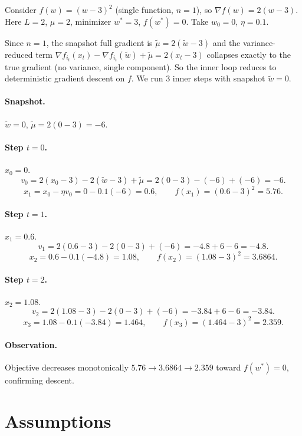 \documentclass{article}
\begin{document}
Consider $f(w) = (w-3)^2$ (single function, $n=1$), so $\nabla f(w) = 2(w-3)$. Here $L=2$, $\mu=2$, minimizer $w^*=3$, $f(w^*)=0$. Take $w_0 = 0$, $\eta = 0.1$.

Since $n=1$, the snapshot full gradient is $\tilde{\mu} = 2(\tilde{w}-3)$ and the variance-reduced term $\nabla f_{i_t}(x_t)-\nabla f_{i_t}(\tilde{w})+\tilde{\mu} = 2(x_t-3)$ collapses exactly to the true gradient (no variance, single component). So the inner loop reduces to deterministic gradient descent on $f$. We run $3$ inner steps with snapshot $\tilde{w}=0$.

\paragraph{Snapshot.} $\tilde{w}=0$, $\tilde{\mu} = 2(0-3) = -6$.

\paragraph{Step $t=0$.} $x_0 = 0$.
\[
v_0 = 2(x_0-3) - 2(\tilde{w}-3) + \tilde{\mu} = 2(0-3) - (-6) + (-6) = -6.
\]
\[
x_1 = x_0 - \eta v_0 = 0 - 0.1(-6) = 0.6, \qquad f(x_1) = (0.6-3)^2 = 5.76.
\]

\paragraph{Step $t=1$.} $x_1 = 0.6$.
\[
v_1 = 2(0.6-3) - 2(0-3) + (-6) = -4.8 + 6 - 6 = -4.8.
\]
\[
x_2 = 0.6 - 0.1(-4.8) = 1.08, \qquad f(x_2) = (1.08-3)^2 = 3.6864.
\]

\paragraph{Step $t=2$.} $x_2 = 1.08$.
\[
v_2 = 2(1.08-3) - 2(0-3) + (-6) = -3.84 + 6 - 6 = -3.84.
\]
\[
x_3 = 1.08 - 0.1(-3.84) = 1.464, \qquad f(x_3) = (1.464-3)^2 = 2.359.
\]

\paragraph{Observation.} Objective decreases monotonically $5.76 \to 3.6864 \to 2.359$ toward $f(w^*)=0$, confirming descent.

\section*{Assumptions}
\end{document}
